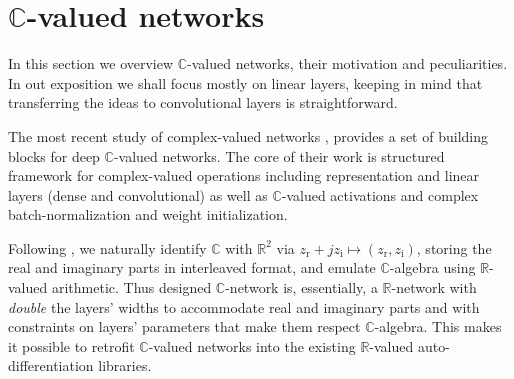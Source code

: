 \documentclass[a4paper,10pt]{article}
\newcommand{\real}{\mathbb{R}}
\newcommand{\cplx}{\mathbb{C}}
\begin{document}




\section{$\cplx$-valued networks} %
\label{sec:c_valued_networks}

In this section we overview $\mathbb{C}$-valued networks, their motivation and peculiarities.
In out exposition we shall focus mostly on linear layers, keeping in mind that transferring 
the ideas to convolutional layers is straightforward.

The most recent study of complex-valued networks \cite{trabelsi_deep_2017}, provides a set
of building blocks for deep $\cplx$-valued networks. The core of their work is structured
framework for complex-valued operations including representation and linear layers (dense
and convolutional) as well as $\cplx$-valued activations and complex batch-normalization
and weight initialization.

Following \cite{trabelsi_deep_2017}, we naturally identify $\cplx$ with $\real^2$ via $
  z_\mathrm{r} + j z_\mathrm{i} \mapsto (z_\mathrm{r}, z_\mathrm{i})
$, storing the real and imaginary parts in interleaved format, and emulate $\cplx$-algebra
using $\real$-valued arithmetic. Thus designed $\cplx$-network is, essentially, a
$\real$-network with \textit{double} the layers' widths to accommodate real and imaginary
parts and with constraints on layers' parameters that make them respect $\cplx$-algebra.
This makes it possible to retrofit $\cplx$-valued networks into the existing $\real$-valued
auto-differentiation libraries.
\end{document}
